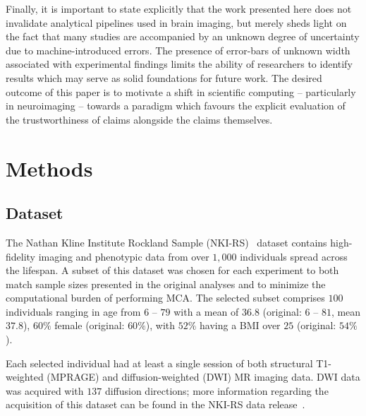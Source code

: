\documentclass[fleqn,10pt]{SelfArx} %
\begin{document}
Finally, it is important to state explicitly that the work presented here does not invalidate analytical pipelines used
in brain imaging, but merely sheds light on the fact that many studies are accompanied by an unknown degree of
uncertainty due to machine-introduced errors. The presence of error-bars of unknown width associated with
experimental findings limits the ability of researchers to identify results which may serve as solid foundations for
future work. The desired outcome of this paper is to motivate a shift in scientific computing – particularly in
neuroimaging – towards a paradigm which favours the explicit evaluation of the trustworthiness of claims alongside the
claims themselves.
 



\clearpage

\section*{Methods}

\subsection*{Dataset}
The Nathan Kline Institute Rockland Sample (NKI-RS)~\cite{Nooner2012-eg} dataset contains high-fidelity imaging and
phenotypic data from over $1,000$ individuals spread across the lifespan. A subset of this dataset was chosen for each
experiment to both match sample sizes presented in the original analyses and to minimize the computational burden of
performing MCA. The selected subset comprises $100$ individuals ranging in age from $6$ – $79$ with a mean of $36.8$
(original: $6$ – $81$, mean $37.8$), $60\%$ female (original: $60\%$), with $52\%$ having a BMI over $25$ (original:
$54\%$).

Each selected individual had at least a single session of both structural T1-weighted (MPRAGE) and diffusion-weighted
(DWI) MR imaging data. DWI data was acquired with $137$ diffusion directions; more information regarding the
acquisition of this dataset can be found in the NKI-RS data release~\cite{Nooner2012-eg}.
\end{document}
